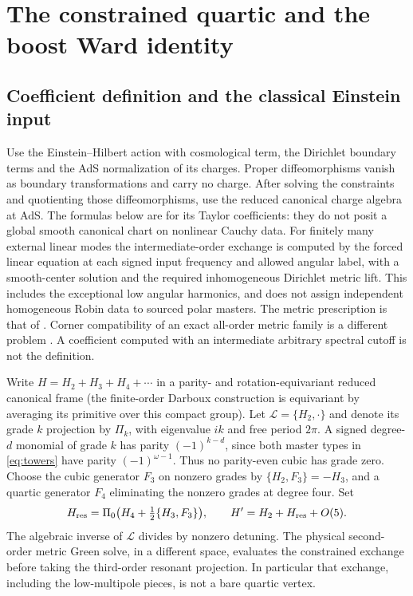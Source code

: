 \documentclass[11pt]{article}
\numberwithin{equation}{section}
\begin{document}
\section{The constrained quartic and the boost Ward identity}\label{sec:ward}
\subsection{Coefficient definition and the classical Einstein input}

Use the Einstein--Hilbert action with cosmological term, the
Dirichlet boundary terms and the AdS normalization of its charges.
Proper diffeomorphisms vanish as boundary transformations and carry
no charge. After solving the constraints and quotienting those
diffeomorphisms, use the reduced canonical charge algebra at AdS.
The formulas below are for its Taylor coefficients: they do not
posit a global smooth canonical chart on nonlinear Cauchy data.
For finitely many external linear modes the intermediate-order
exchange is computed by the forced linear equation at each
signed input frequency and allowed angular label, with a smooth-center
solution and the required inhomogeneous Dirichlet metric lift. This
includes the exceptional low angular harmonics, and does not assign
independent homogeneous Robin data to sourced polar masters.
The metric prescription is that of \cite[Section II and Appendix A]{ds}.
Corner compatibility of an exact all-order metric family is a
different problem \cite{soutetre}. A coefficient computed with an
intermediate arbitrary spectral cutoff is not the definition.

Write \(H=H_2+H_3+H_4+\cdots\) in a parity- and rotation-equivariant
reduced canonical frame (the finite-order Darboux construction is
equivariant by averaging its primitive over this compact group).
Let \(\mathcal L=\{H_2,\cdot\}\) and denote its grade \(k\)
projection by \(\Pi_k\), with eigenvalue \(ik\) and free period \(2\pi\).
A signed degree-\(d\) monomial of grade \(k\) has parity
\((-1)^{k-d}\), since both master types in \eqref{eq:towers}
have parity \((-1)^{\omega-1}\). Thus no parity-even cubic
has grade zero. Choose the cubic generator \(F_3\) on nonzero
grades by \(\{H_2,F_3\}=-H_3\), and a quartic generator \(F_4\)
eliminating the nonzero grades at degree four. Set
\begin{equation}\label{eq:nf}
 H_{\rm res}=\Pi_0\big(H_4+\tfrac12\{H_3,F_3\}\big),
 \qquad H'=H_2+H_{\rm res}+O(5).
\end{equation}
The algebraic inverse of \(\mathcal L\) divides by nonzero detuning.
The physical second-order metric Green solve, in a different
space, evaluates the constrained exchange before taking the
third-order resonant projection. In particular that exchange,
including the low-multipole pieces, is not a bare quartic vertex.
\end{document}
